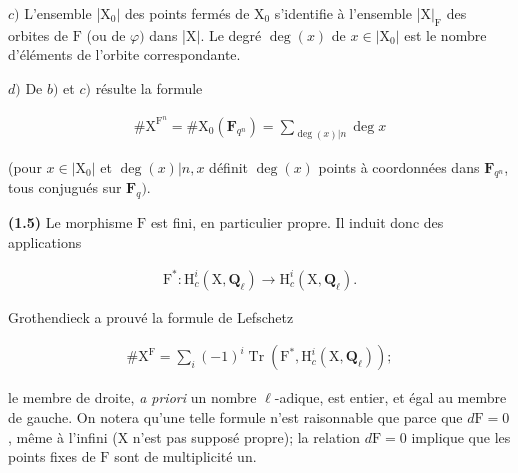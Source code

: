 \documentclass[10pt,leqno]{article}
\begin{document}
\noindent \(c)\) L’ensemble |\(\mathrm{X}_{0}|\) des points fermés de \(\mathrm{X}_{0}\) s’identifie à l’ensemble |\(\mathrm{X}|_{\mathrm{F}}\) des orbites de \(\mathrm{F}\) (ou de \(\varphi )\) dans |\(\mathrm{X}|\). Le degré \(\operatorname{deg}(x)\) de \(x\in |\mathrm{X}_{0}|\) est le nombre d’éléments de l’orbite correspondante.\par

\noindent \(d)\) De \(b)\) et \(c)\) résulte la formule\par

\begin{equation*}\begin{gathered}\# \mathrm{X}^{\mathrm{F}^{n}} = \# \mathrm{X}_{0}(\mathbf{F}_{q^{n}}) = \sum _{\operatorname{deg}(x)|n} \operatorname{deg} x\end{gathered}\tag{1.4.1}\end{equation*}

\noindent (pour \(x\in |\mathrm{X}_{0}|\) et \(\operatorname{deg}(x)|n, x\) définit \(\operatorname{deg}(x)\) points à coordonnées dans \(\mathbf{F}_{q^{n}}\), tous conjugués sur \(\mathbf{F}_{q})\).\par

\noindent \textbf{(1.5)} Le morphisme \(\mathrm{F}\) est fini, en particulier propre. Il induit donc des applications\par

\begin{equation*}\begin{gathered}\mathrm{F}^{*} : \mathrm{H}_{c}^{i}(\mathrm{X}, \mathbf{Q}_{\ell }) \longrightarrow  \mathrm{H}_{c}^{i}(\mathrm{X}, \mathbf{Q}_{\ell }).\end{gathered}\end{equation*}

\noindent Grothendieck a prouvé la formule de Lefschetz\par

\begin{equation*}\begin{gathered}\# \mathrm{X}^{\mathrm{F}} = \sum _{i} (- 1)^{i} \operatorname{Tr}(\mathrm{F}^{*}, \mathrm{H}_{c}^{i}(\mathrm{X}, \mathbf{Q}_{\ell }));\end{gathered}\end{equation*}

\noindent le membre de droite, \emph{a priori} un nombre \(\ell \)-adique, est entier, et égal au membre de gauche. On notera qu’une telle formule n’est raisonnable que parce que \(d\mathrm{F}=0\), même à l’infini (\(\mathrm{X}\) n’est pas supposé propre); la relation \(d\mathrm{F}=0\) implique que les points fixes de \(\mathrm{F}\) sont de multiplicité un.\par
\end{document}
